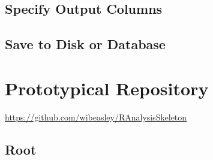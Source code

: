 \documentclass[]{book}
\begin{document}
\hypertarget{specify-output-columns}{%
\section{Specify Output Columns}\label{specify-output-columns}}

\hypertarget{save-to-disk-or-database}{%
\section{Save to Disk or Database}\label{save-to-disk-or-database}}

\hypertarget{repo-prototype}{%
\chapter{Prototypical Repository}\label{repo-prototype}}

\url{https://github.com/wibeasley/RAnalysisSkeleton}

\hypertarget{repo-root}{%
\section{Root}\label{repo-root}}
\end{document}

